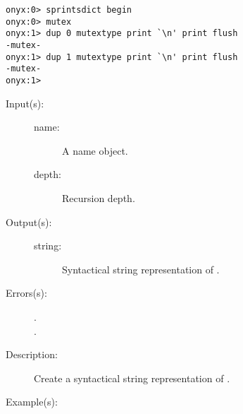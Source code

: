 \begin{description}
\begin{description}
\begin{verbatim}
onyx:0> sprintsdict begin
onyx:0> mutex
onyx:1> dup 0 mutextype print `\n' print flush
-mutex-
onyx:1> dup 1 mutextype print `\n' print flush
-mutex-
onyx:1>
		\end{verbatim}
	\end{description}
\label{sprintsdict:nametype}
\item[{\onyxop{name depth}{nametype}{string}}: ]
	\begin{description}\item[]
	\item[Input(s): ]
		\begin{description}\item[]
		\item[name: ]
			A name object.
		\item[depth: ]
			Recursion depth.
		\end{description}
	\item[Output(s): ]
		\begin{description}\item[]
		\item[string: ]
			Syntactical string representation of .
		\end{description}
	\item[Errors(s): ]
		\begin{description}\item[]
		\item[.]
		\item[.]
		\end{description}
	\item[Description: ]
		Create a syntactical string representation of .
	\item[Example(s): ]\begin{verbatim}


\end{verbatim}
\end{description}
\end{description}
